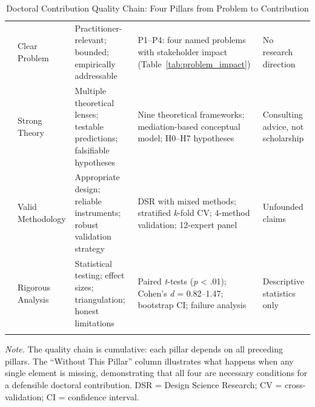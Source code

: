 {\tablestripes\tablefontsize
{}
\begin{xltabular}{\textwidth}{@{} >{\raggedright\arraybackslash}p{1.0cm} >{\raggedright\arraybackslash}p{3.1cm} p{3.6cm} p{3.9cm} p{2.4cm} @{}}
\caption[Doctoral Contribution Quality Chain]{Doctoral Contribution Quality Chain: Four Pillars from Problem to Contribution}\label{tab:doctoral_quality_chain} \\
\toprule
\thead{\#} &  &  &  &  \\
\midrule
\endfirsthead
\endhead
\bottomrule
{} & Clear Problem & Practitioner-relevant; bounded; empirically addressable & P1--P4: four named problems with stakeholder impact (Table~\ref{tab:problem_impact}) & No research direction \\
 & Strong Theory & Multiple theoretical lenses; testable predictions; falsifiable hypotheses & Nine theoretical frameworks; mediation-based conceptual model; H0--H7 hypotheses & Consulting advice, not scholarship \\
 & Valid Methodology & Appropriate design; reliable instruments; robust validation strategy & DSR with mixed methods; stratified \textit{k}-fold CV; 4-method validation; 12-expert panel & Unfounded claims \\
 & Rigorous Analysis & Statistical testing; effect sizes; triangulation; honest limitations & Paired \textit{t}-tests (\textit{p} < .01); Cohen's \textit{d} = 0.82--1.47; bootstrap CI; failure analysis & Descriptive statistics only \\
\midrule
{} &  \\
\end{xltabular}}
\vspace{0.5em}
\noindent\textit{Note.} The quality chain is cumulative: each pillar depends on all preceding pillars. The ``Without This Pillar'' column illustrates what happens when any single element is missing, demonstrating that all four are necessary conditions for a defensible doctoral contribution. DSR = Design Science Research; CV = cross-validation; CI = confidence interval.
\fi

\iffalse %
